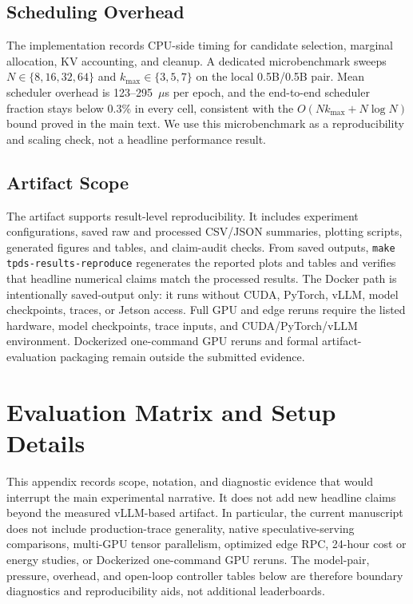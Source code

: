 \documentclass[10pt,journal,onecolumn]{IEEEtran}
\begin{document}
\subsection{Scheduling Overhead}
\label{sec:overhead}

The implementation records CPU-side timing for candidate selection,
marginal allocation, KV accounting, and cleanup. A dedicated
microbenchmark sweeps $N\in\{8,16,32,64\}$ and
$k_{\max}\in\{3,5,7\}$ on the local 0.5B/0.5B pair. Mean scheduler
overhead is 123--295~$\mu$s per epoch, and the end-to-end scheduler
fraction stays below 0.3\% in every cell, consistent with the
$O(N k_{\max}+N\log N)$ bound proved in the main text.
We use this microbenchmark as a reproducibility and scaling check, not
a headline performance result.

\subsection{Artifact Scope}
\label{sec:artifact-scope}

The artifact supports result-level reproducibility. It includes
experiment configurations, saved raw and processed CSV/JSON summaries,
plotting scripts, generated figures and tables, and claim-audit checks.
From saved outputs, \texttt{make tpds-results-reproduce} regenerates
the reported plots and tables and verifies that headline numerical
claims match the processed results. The Docker path is intentionally
saved-output only: it runs without CUDA, PyTorch, vLLM, model
checkpoints, traces, or Jetson access. Full GPU and edge reruns require
the listed hardware, model checkpoints, trace inputs, and
CUDA/PyTorch/vLLM environment. Dockerized one-command GPU reruns and
formal artifact-evaluation packaging remain outside the submitted
evidence.

\section{Evaluation Matrix and Setup Details}
\label{app:evaluation-scope}

This appendix records scope, notation, and diagnostic evidence that
would interrupt the main experimental narrative. It does not add new
headline claims beyond the measured vLLM-based artifact. In particular,
the current manuscript does not include production-trace generality,
native speculative-serving comparisons, multi-GPU tensor parallelism,
optimized edge RPC, 24-hour cost or energy studies, or Dockerized
one-command GPU reruns. The model-pair, pressure, overhead, and
open-loop controller tables below are therefore boundary diagnostics
and reproducibility aids, not additional leaderboards.
\end{document}

